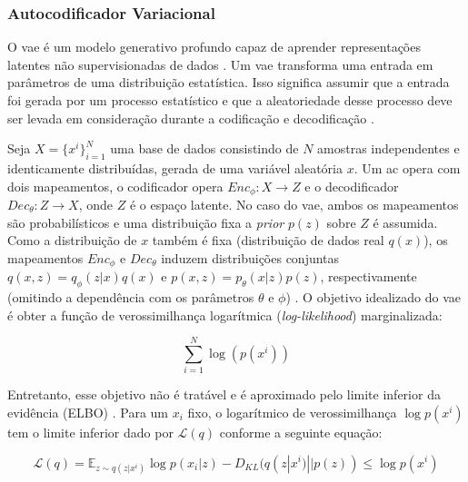 

\subsubsection{Autocodificador Variacional}


O \gls{vae} \cite{kingma2013auto,rezende2014stochastic} é um modelo generativo profundo capaz de aprender representações latentes não supervisionadas de dados \cite{klys2018learning}.
Um \acrshort{vae} transforma uma entrada em parâmetros de uma distribuição estatística. Isso significa assumir que a entrada foi gerada por um processo estatístico e que a aleatoriedade desse processo deve ser levada em consideração durante a codificação e decodificação \cite{FrancoisDeepLearning}.

Seja $X = \{x^i\}_{i=1}^N$ uma base de dados consistindo de $N$ amostras independentes e identicamente distribuídas, gerada de uma variável aleatória $x$. Um \acrshort{ac} opera com dois mapeamentos, o codificador opera $Enc_{\phi}:X \rightarrow Z$ e o decodificador $Dec_{\theta}:Z \rightarrow X$, onde $Z$ é o espaço latente. No caso do \acrshort{vae}, ambos os mapeamentos são probabilísticos e uma distribuição fixa a \textit{prior} $p(z)$ sobre $Z$ é assumida. Como a distribuição de $x$ também é fixa (distribuição de dados real $q(x)$), os mapeamentos $Enc_{\phi}$ e  $Dec_{\theta}$ induzem distribuições conjuntas $q(x,z) = q_{\phi}(z|x)q(x)$ e $p(x,z) = p_{\theta}(x|z)p(z)$, respectivamente (omitindo a dependência com os parâmetros $\theta$ e $\phi$) \cite{rolinek2019variational}. O objetivo idealizado do \acrshort{vae} é obter a função de verossimilhança logarítmica (\textit{log-likelihood}) marginalizada:


\begin{equation}
\sum_{i=1}^N \log (p(x^i))
\end{equation}

Entretanto, esse objetivo não é tratável e é aproximado pelo limite inferior da evidência (ELBO) \cite{kingma2013auto}. Para um $x_i$ fixo, o logarítmico de verossimilhança $\log p(x^i)$ tem o limite inferior dado por $\mathcal{L}(q)$ conforme a seguinte equação:

\begin{equation}
\label{elbo}
\mathcal{L}(q) = \mathbb{E}_{z \sim q(z|x^i)} \log p(x_i|z) - D_{KL}(q(z|x^i)||p(z)) \leq \log p(x^i)
\end{equation}

